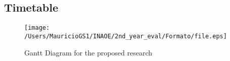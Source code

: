 \documentclass[english,letterpaper,12pt,final]{article}
\theoremstyle{definition}
\begin{document}
\subsection{Timetable}
\begin{figure}[ht]
\vskip 0.2in
\begin{center}
\texttt{[image: /Users/MauricioGS1/INAOE/2nd\_year\_eval/Formato/file.eps]}
\caption{Gantt Diagram for the proposed research}
\label{Gantt}
\end{center}
\vskip -0.2in
\end{figure}
\newpage
\singlespacing



\end{document}
